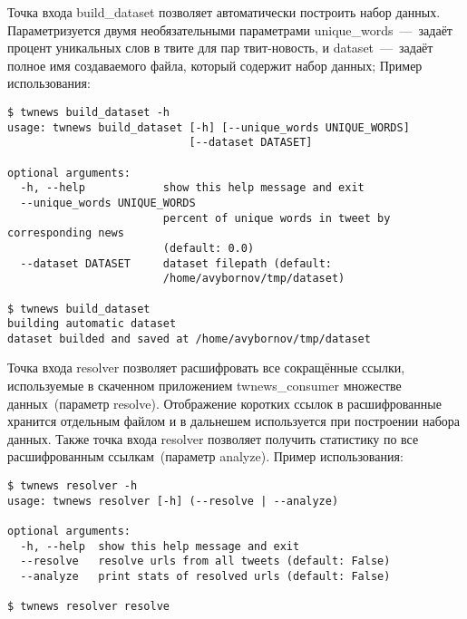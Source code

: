 
        Точка входа build\_dataset позволяет автоматически построить набор данных. Параметризуется двумя необязательными параметрами
        unique\_words~---~задаёт процент уникальных слов в твите для пар твит-новость, и dataset~---~задаёт полное имя создаваемого файла, который содержит набор данных;
        Пример использования:
        \begin{lstlisting}
$ twnews build_dataset -h
usage: twnews build_dataset [-h] [--unique_words UNIQUE_WORDS]
                            [--dataset DATASET]

optional arguments:
  -h, --help            show this help message and exit
  --unique_words UNIQUE_WORDS
                        percent of unique words in tweet by corresponding news
                        (default: 0.0)
  --dataset DATASET     dataset filepath (default:
                        /home/avybornov/tmp/dataset)

$ twnews build_dataset
building automatic dataset
dataset builded and saved at /home/avybornov/tmp/dataset
        \end{lstlisting}


        Точка входа resolver позволяет расшифровать все сокращённые ссылки, используемые в скаченном приложением twnews\_consumer множестве данных~(параметр resolve).
        Отображение коротких ссылок в расшифрованные хранится отдельным файлом и в дальнешем используется при построении набора данных.
        Также точка входа resolver позволяет получить статистику по все расшифрованным ссылкам~(параметр analyze).
        Пример использования:
        \begin{lstlisting}
$ twnews resolver -h
usage: twnews resolver [-h] (--resolve | --analyze)

optional arguments:
  -h, --help  show this help message and exit
  --resolve   resolve urls from all tweets (default: False)
  --analyze   print stats of resolved urls (default: False)

$ twnews resolver resolve
        \end{lstlisting}


